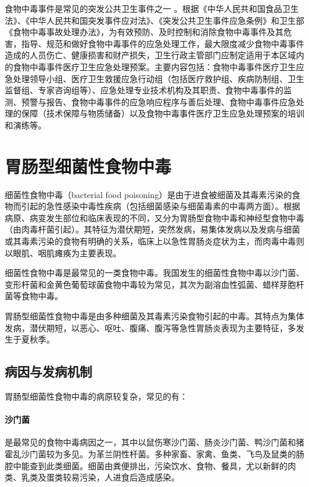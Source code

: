 食物中毒事件是常见的突发公共卫生事件之一
。根据《中华人民共和国食品卫生法》、《中华人民共和国突发事件应对法》、《突发公共卫生事件应急条例》和卫生部《食物中毒事故处理办法》，为有效预防、及时控制和消除食物中毒事件及其危害，指导、规范和做好食物中毒事件的应急处理工作，最大限度减少食物中毒事件造成的人员伤亡、健康损害和财产损失，卫生行政主管部门应制定适用于本区域内的食物中毒事件医疗卫生应急处理预案。主要内容包括：食物中毒事件医疗卫生应急处理领导小组、医疗卫生救援应急行动组（包括医疗救护组、疾病防制组、卫生监督组、专家咨询组等）、应急处理专业技术机构及其职责、食物中毒事件的监测、预警与报告、食物中毒事件的应急响应程序与善后处理、食物中毒事件应急处理的保障（技术保障与物质储备）以及食物中毒事件医疗卫生应急处理预案的培训和演练等。

\protect\hypertarget{text00183.html}{}{}

\section{胃肠型细菌性食物中毒}

细菌性食物中毒（bacterial food
poisoning）是由于进食被细菌及其毒素污染的食物而引起的急性感染中毒性疾病（包括细菌感染与细菌毒素的中毒两方面）。根据病原、病变发生部位和临床表现的不同，又分为胃肠型食物中毒和神经型食物中毒（由肉毒杆菌引起）。其特征为潜伏期短，突然发病，易集体发病以及发病与细菌或其毒素污染的食物有明确的关系，临床上以急性胃肠炎症状为主，而肉毒中毒则以眼肌、咽肌瘫痪为主要表现。

细菌性食物中毒是最常见的一类食物中毒。我国发生的细菌性食物中毒以沙门菌、变形杆菌和金黄色葡萄球菌食物中毒较为常见，其次为副溶血性弧菌、蜡样芽胞杆菌等食物中毒。

胃肠型细菌性食物中毒是由多种细菌及其毒素污染食物引起的中毒。其特点为集体发病，潜伏期短，以恶心、呕吐、腹痛、腹泻等急性胃肠炎表现为主要特征，多发生于夏秋季。

\subsection{病因与发病机制}

胃肠型细菌性食物中毒的病原较复杂，常见的有：

\paragraph{沙门菌}

是最常见的食物中毒病因之一，其中以鼠伤寒沙门菌、肠炎沙门菌、鸭沙门菌和猪霍乱沙门菌较为多见。为革兰阴性杆菌。多种家畜、家禽、鱼类、飞鸟及鼠类的肠腔中能查到此类细菌。细菌由粪便排出，污染饮水、食物、餐具，尤以新鲜的肉类、乳类及蛋类较易污染，人进食后造成感染。


